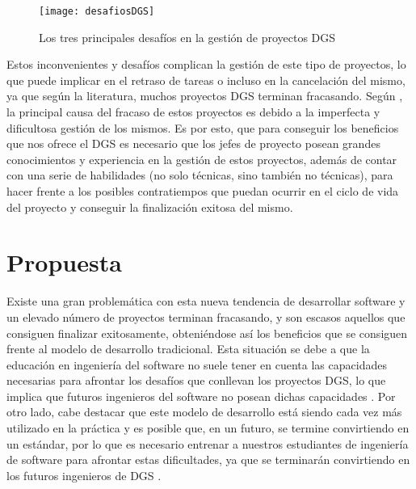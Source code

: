 \begin{figure}[htb]
	\centering
	\texttt{[image: desafiosDGS]}
	\caption[Desafíos en los proyectos DGS]{Los tres principales desafíos en la gestión de proyectos DGS}
	\label{fig:desafiosDGS}
\end{figure}

Estos inconvenientes y desafíos complican la gestión de este tipo de proyectos, lo que puede implicar en el retraso de tareas o incluso en la cancelación del mismo, ya que según la literatura, muchos proyectos DGS terminan fracasando. Según \cite{lino2015project}, la principal causa del fracaso de estos proyectos es debido a la imperfecta y dificultosa gestión de los mismos. Es por esto, que para conseguir los beneficios que nos ofrece el DGS es necesario que los jefes de proyecto posean grandes conocimientos y experiencia en la gestión de estos proyectos, además de contar con una serie de habilidades (no solo técnicas, sino también no técnicas), para hacer frente a los posibles contratiempos que puedan ocurrir en el ciclo de vida del proyecto y conseguir la finalización exitosa del mismo.

\newpage
\section{Propuesta}
\label{sec:Propuesta}

Existe una gran problemática con esta nueva tendencia de desarrollar software y un elevado número de proyectos terminan fracasando, y son escasos aquellos que consiguen finalizar exitosamente, obteniéndose así los beneficios que se consiguen frente al modelo de desarrollo tradicional. Esta situación se debe a que la educación en ingeniería del software no suele tener en cuenta las capacidades necesarias para afrontar los desafíos que conllevan los proyectos DGS, lo que implica que futuros ingenieros del software no posean dichas capacidades \cite{monasor2010preparing}. Por otro lado, cabe destacar que este modelo de desarrollo está siendo cada vez más utilizado en la práctica y es posible que, en un futuro, se termine convirtiendo en un estándar, por lo que es necesario entrenar a nuestros estudiantes de ingeniería de software para afrontar estas dificultades, ya que se terminarán convirtiendo en los futuros ingenieros de DGS \cite{beecham2017best}.

